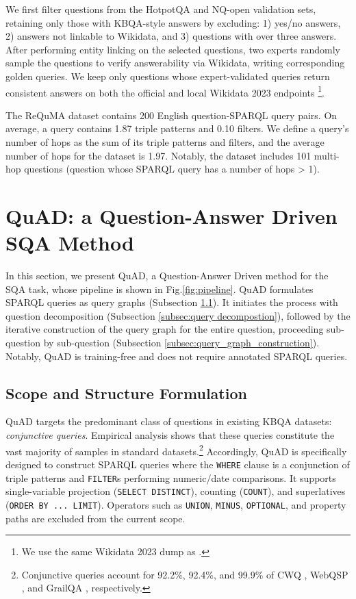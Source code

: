 \documentclass[runningheads]{llncs}
\begin{document}
We first filter questions from the HotpotQA and NQ-open validation sets, retaining only those with KBQA-style answers by excluding: 1) yes/no answers, 2) answers not linkable to Wikidata, and 3) questions with over three answers. After performing entity linking on the selected questions, two experts randomly sample the questions to verify answerability via Wikidata, writing corresponding golden queries. 
We keep only questions whose expert-validated queries return consistent answers on both the official and local Wikidata 2023 endpoints \footnote{We use the same Wikidata 2023 dump as \cite{huang2023markqa}.}.

The ReQuMA dataset contains 200 English question-SPARQL query pairs. On average, a query contains 1.87 triple patterns and 0.10 filters.
We define a query's number of hops as the sum of its triple patterns and filters, and the average number of hops for the dataset is 1.97. Notably, the dataset includes 101 multi-hop questions (question whose SPARQL query has a number of hops > 1).

\section{QuAD: a Question-Answer Driven SQA Method}\label{sec:methods}

In this section, we present QuAD, a Question-Answer Driven method for the SQA task, whose pipeline is shown in Fig.\ref{fig:pipeline}. 
QuAD formulates SPARQL queries as query graphs (Subsection \ref{subsec:query_graph_formulation}). It initiates the process with question decomposition (Subsection \ref{subsec:query decompostion}), followed by the iterative construction of the query graph for the entire question, proceeding sub-question by sub-question (Subsection \ref{subsec:query_graph_construction}). Notably, QuAD is training-free and does not require annotated SPARQL queries.

\subsection{Scope and Structure Formulation}\label{subsec:query_graph_formulation}
QuAD targets the predominant class of questions in existing KBQA datasets: \textit{conjunctive queries}. Empirical analysis shows that these queries constitute the vast majority of samples in standard datasets.\footnote{Conjunctive queries account for 92.2\%, 92.4\%, and 99.9\% of CWQ \cite{talmor2018web}, WebQSP \cite{yih2016value}, and GrailQA \cite{gu2021beyond}, respectively.} 
Accordingly, QuAD is specifically designed to construct SPARQL queries where the \texttt{WHERE} clause is a conjunction of triple patterns and \texttt{FILTER}s performing numeric/date comparisons. It supports single-variable projection (\texttt{SELECT DISTINCT}), counting (\texttt{COUNT}), and superlatives (\texttt{ORDER BY ... LIMIT}). Operators such as \texttt{UNION}, \texttt{MINUS}, \texttt{OPTIONAL}, and property paths are excluded from the current scope.
\end{document}

